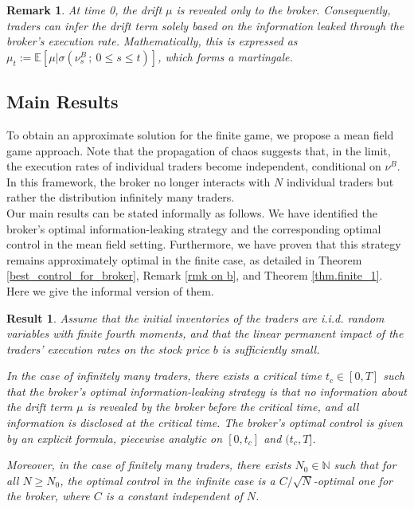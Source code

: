 \documentclass[10pt]{article}
\newtheorem{remark}[theorem]{Remark}
\newtheorem{result}{Result}
\begin{document}
\begin{remark}\label{drift_for_traders}
    At time 0, the drift \( \mu \) is revealed only to the broker. Consequently, traders can infer the drift term solely based on the information leaked through the broker's execution rate. Mathematically, this is expressed as \( \mu_t := \mathbb{E} [ \mu | \sigma(\nu^B_s \, ; ~ 0 \leq s \leq t) ] \), which forms a martingale.
\end{remark}


\subsection{Main Results}

To obtain an approximate solution for the finite game, we propose a mean field game approach. Note that the propagation of chaos suggests that, in the limit, the execution rates of individual traders become independent, conditional on \( \nu^B \). In this framework, the broker no longer interacts with \( N \) individual traders but rather the distribution infinitely many traders.\\

Our main results can be stated informally as follows. We have identified the broker's optimal information-leaking strategy and the corresponding optimal control in the mean field setting. Furthermore, we have proven that this strategy remains approximately optimal in the finite case, as detailed in Theorem \ref{best_control_for_broker}, Remark \ref{rmk on b}, and Theorem \ref{thm.finite_1}. Here we give the informal version of them.



\begin{result}\label{Main_Result}
Assume that the initial inventories of the traders are i.i.d. random variables with finite fourth moments, and that the linear permanent impact of the traders' execution rates on the stock price \( b \) is sufficiently small.\\\vspace{-1.8ex}

In the case of infinitely many traders, there exists a critical time \( t_c \in [0,T] \) such that the broker's optimal information-leaking strategy is that no information about the drift term \( \mu \) is revealed by the broker before the critical time, and all information is disclosed at the critical time. The broker's optimal control is given by an explicit formula, piecewise analytic on \( [0,t_c] \) and \( (t_c, T] \).\\\vspace{-1.8ex}



Moreover, in the case of finitely many traders, there exists \( N_0 \in \mathbb{N} \) such that for all \( N \geq N_0 \), the optimal control in the infinite case is a \( C/\sqrt{N} \)-optimal one for the broker, where \( C \) is a constant independent of \( N \).
\end{result}
\end{document}
